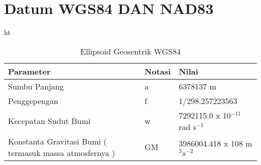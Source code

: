 \section{Datum WGS84 DAN NAD83}

\begin{table}{ht}
\caption{Ellipsoid Geosentrik WGS84}
\centering
\begin{tabular}{p{1.25in}p{1.25in}p{1.25in}}
\hline
Parameter&Notasi&Nilai\\
\hline
Sumbu Panjang & a & 6378137 m\\
Penggepengan & f & 1/298.257223563\\
Kecepatan Sudut Bumi & w & 7292115.0 x 10$^{-11}$ rad s$^{-1}$\\
Konstanta Gravitasi Bumi ( termasuk massa atmosfernya ) & GM & 3986004.418 x 108 m$^3$$ s^{-2}$\\
\hline
\end{tabular}
\label{table:contoh}
\end{table}


